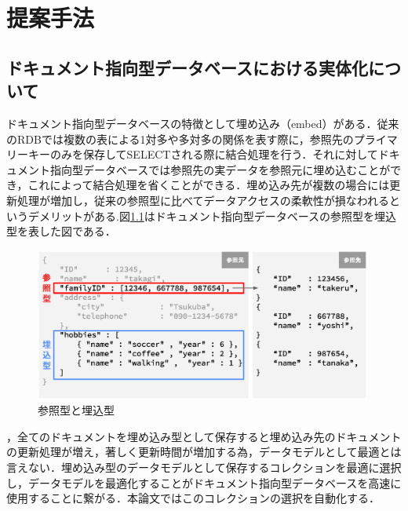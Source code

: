\documentclass[a4paper,11pt]{ujreport}
\begin{document}
\chapter{提案手法}
\section{ドキュメント指向型データベースにおける実体化について}
ドキュメント指向型データベースの特徴として埋め込み（embed）がある．従来のRDBでは複数の表による1対多や多対多の関係を表す際に，参照先のプライマリーキーのみを保存してSELECTされる際に結合処理を行う．それに対してドキュメント指向型データベースでは参照先の実データを参照元に埋め込むことができ，これによって結合処理を省くことができる．埋め込み先が複数の場合には更新処理が増加し，従来の参照型に比べてデータアクセスの柔軟性が損なわれるというデメリットがある\cite{Sky株式会社201212}.図\ref{EmbedReference}はドキュメント指向型データベースの参照型を埋込型を表した図である．
\begin{figure}[htbp]
	\begin{center}
		\includegraphics[width=30em, trim=0 5em 0 0]{src/EmbedReference.eps} %
	\end{center}
	\caption{参照型と埋込型}
	\label{EmbedReference}
\end{figure}
，全てのドキュメントを埋め込み型として保存すると埋め込み先のドキュメントの更新処理が増え，著しく更新時間が増加する為，データモデルとして最適とは言えない．埋め込み型のデータモデルとして保存するコレクションを最適に選択し，データモデルを最適化することがドキュメント指向型データベースを高速に使用することに繋がる．本論文ではこのコレクションの選択を自動化する．
\end{document}
